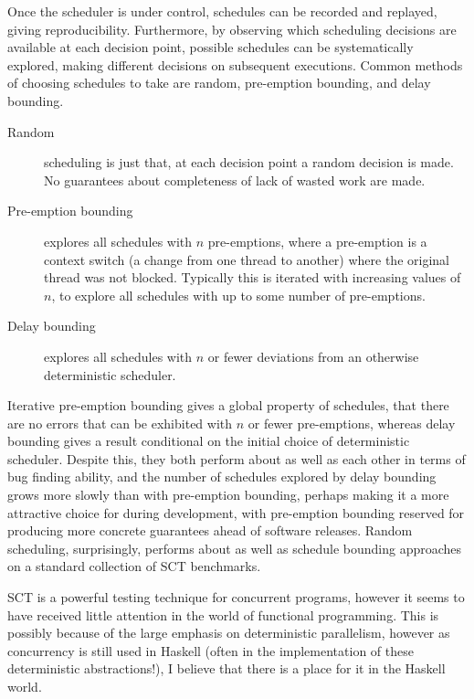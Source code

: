 Once the scheduler is under control, schedules can be recorded and
replayed, giving reproducibility. Furthermore, by observing which
scheduling decisions are available at each decision point, possible
schedules can be systematically explored, making different decisions
on subsequent executions. Common methods of choosing schedules to take
are random, pre-emption bounding\cite{pbound}, and delay
bounding\cite{dbound}.

\begin{description}
  \item[Random] scheduling is just that, at each decision point a
    random decision is made. No guarantees about completeness of lack
    of wasted work are made.

  \item[Pre-emption bounding] explores all schedules with $n$
    pre-emptions, where a pre-emption is a context switch (a change
    from one thread to another) where the original thread was not
    blocked. Typically this is iterated with increasing values of $n$,
    to explore all schedules with up to some number of pre-emptions.

  \item[Delay bounding] explores all schedules with $n$ or fewer
    deviations from an otherwise deterministic scheduler.
\end{description}

Iterative pre-emption bounding gives a global property of schedules,
that there are no errors that can be exhibited with $n$ or fewer
pre-emptions, whereas delay bounding gives a result conditional on the
initial choice of deterministic scheduler. Despite this, they both
perform about as well as each other in terms of bug finding
ability\cite{empirical}, and the number of schedules explored by delay
bounding grows more slowly than with pre-emption
bounding\cite{dbound}, perhaps making it a more attractive choice for
during development, with pre-emption bounding reserved for producing
more concrete guarantees ahead of software releases. Random
scheduling, surprisingly, performs about as well as schedule bounding
approaches on a standard collection of SCT benchmarks\cite{empirical}.

SCT is a powerful testing technique for concurrent programs, however
it seems to have received little attention in the world of functional
programming. This is possibly because of the large emphasis on
deterministic parallelism, however as concurrency is still used in
Haskell (often in the implementation of these deterministic
abstractions!), I believe that there is a place for it in the Haskell
world.

